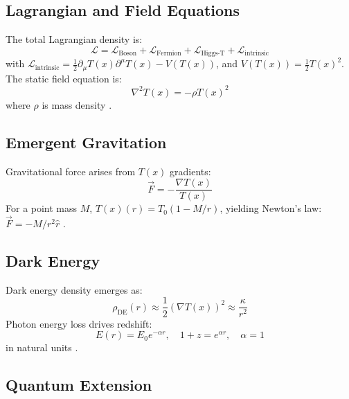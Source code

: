 \documentclass[12pt,a4paper]{article}
\newcommand{\Tfield}{T(x)}
\newcommand{\Tzero}{T_0}
\begin{document}
	\subsection{Lagrangian and Field Equations}
	
	The total Lagrangian density is:
	\begin{equation}
		\mathcal{L} = \mathcal{L}_{\text{Boson}} + \mathcal{L}_{\text{Fermion}} + \mathcal{L}_{\text{Higgs-T}} + \mathcal{L}_{\text{intrinsic}}
	\end{equation}
	with \(\mathcal{L}_{\text{intrinsic}} = \frac{1}{2} \partial_\mu \Tfield \partial^\mu \Tfield - V(\Tfield)\), and \(V(\Tfield) = \frac{1}{2} \Tfield^2\). The static field equation is:
	\begin{equation}
		\nabla^2 \Tfield = -\rho \Tfield^2
	\end{equation}
	where \(\rho\) is mass density \cite{pascher_lagrange_2025}.
	
	\subsection{Emergent Gravitation}
	
	Gravitational force arises from \(\Tfield\) gradients:
	\begin{equation}
		\vec{F} = -\frac{\nabla \Tfield}{\Tfield}
	\end{equation}
	For a point mass \(M\), \(\Tfield(r) = \Tzero (1 - M/r)\), yielding Newton’s law: \(\vec{F} = -M/r^2 \hat{r}\) \cite{pascher_galaxies_2025}.
	
	\subsection{Dark Energy}
	
	Dark energy density emerges as:
	\begin{equation}
		\rho_{\text{DE}}(r) \approx \frac{1}{2} (\nabla \Tfield)^2 \approx \frac{\kappa}{r^2}
	\end{equation}
	Photon energy loss drives redshift:
	\begin{equation}
		E(r) = E_0 e^{-\alpha r}, \quad 1 + z = e^{\alpha r}, \quad \alpha = 1
	\end{equation}
	in natural units \cite{pascher_energiedynamik_2025}.
	
	\subsection{Quantum Extension}
	
\end{document}
